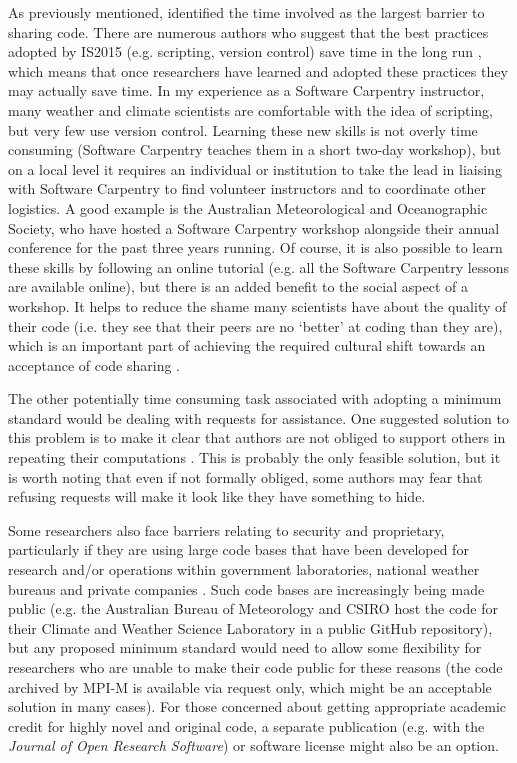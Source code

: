 As previously mentioned, \citet{Stodden2010} identified the time involved as the largest barrier to sharing code. There are numerous authors who suggest that the best practices adopted by IS2015 (e.g. scripting, version control) save time in the long run \citep[e.g.][]{Sandve2013,Wilson2014a}, which means that once researchers have learned and adopted these practices they may actually save time. In my experience as a Software Carpentry \citep{Wilson2014} instructor, many weather and climate scientists are comfortable with the idea of scripting, but very few use version control. Learning these new skills is not overly time consuming (Software Carpentry teaches them in a short two-day workshop), but on a local level it requires an individual or institution to take the lead in liaising with Software Carpentry to find volunteer instructors and to coordinate other logistics. A good example is the Australian Meteorological and Oceanographic Society, who have hosted a Software Carpentry workshop alongside their annual conference for the past three years running. Of course, it is also possible to learn these skills by following an online tutorial (e.g. all the Software Carpentry lessons are available online), but there is an added benefit to the social aspect of a workshop. It helps to reduce the shame many scientists have about the quality of their code (i.e. they see that their peers are no `better' at coding than they are), which is an important part of achieving the required cultural shift towards an acceptance of code sharing \citep{Barnes2010}.

The other potentially time consuming task associated with adopting a minimum standard would be dealing with requests for assistance. One suggested solution to this problem is to make it clear that authors are not obliged to support others in repeating their computations \citep{Easterbrook2014}. This is probably the only feasible solution, but it is worth noting that even if not formally obliged, some authors may fear that refusing requests will make it look like they have something to hide. 

Some researchers also face barriers relating to security and proprietary, particularly if they are using large code bases that have been developed for research and/or operations within government laboratories, national weather bureaus and private companies \citep{Stodden2010}. Such code bases are increasingly being made public (e.g. the Australian Bureau of Meteorology and CSIRO host the code for their Climate and Weather Science Laboratory in a public GitHub repository), but any proposed minimum standard would need to allow some flexibility for researchers who are unable to make their code public for these reasons (the code archived by MPI-M is available via request only, which might be an acceptable solution in many cases). For those concerned about getting appropriate academic credit for highly novel and original code, a separate publication (e.g. with the \textit{Journal of Open Research Software}) or software license \citep[e.g.][]{Morin2012} might also be an option.

